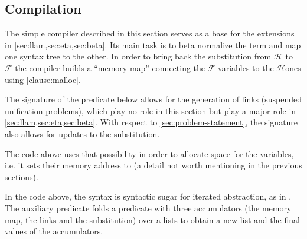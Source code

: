 \documentclass[sigconf,natbib=false,review]{acmart}
\newcommand{\llambda}{\ensuremath{\mathcal{L}}\xspace}
\newcommand{\Fo}{\texorpdfstring{\ensuremath{\mathcal{F}\xspace}}{F}} %
\newcommand{\Ho}{\texorpdfstring{\ensuremath{\mathcal{H}}\xspace}{H}}
\begin{document}



\subsection{Compilation}
\label{sec:compilation}

The simple compiler described in this section serves as a base for the
extensions in \cref{sec:llam,sec:eta,sec:beta}.
Its main task is to beta normalize the term and map one syntax tree to
the other.
In order to bring back the substitution from \Ho{} to \Fo{} the compiler
builds a ``memory map'' connecting the \Fo{} variables to the \Ho ones
using %
\ref{clause:malloc}.

The signature of the  predicate below allows for the generation of
links (suspended unification problems), which play no role in this section
but play a major role in \cref{sec:llam,sec:eta,sec:beta}.
With respect to \cref{sec:problem-statement}, the signature also allows
for updates to the substitution.




\noindent
The code above uses that possibility
in order to allocate space for the variables, i.e. it sets their memory
address to  (a detail not worth mentioning in the
previous sections).



\noindent
In the code above, the syntax  is syntactic sugar for
iterated  abstraction, as in .
The auxiliary predicate  folds a predicate
with three accumulators (the memory map, the links and the substitution)
over a lists to obtain a new list and the final values of the
accumulators.
\end{document}
